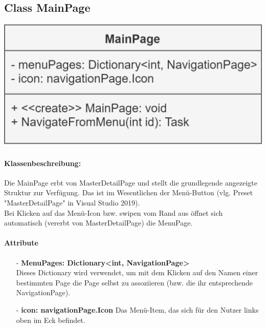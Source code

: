 \documentclass[a4paper,12pt]{article}
\begin{document}
		\begin{minipage}[b]{0.7\textwidth}

			\subsection{Class MainPage}
		\end{minipage}
		\begin{minipage}[c]{0.3\textwidth}
			\includegraphics[width=\textwidth]{bilder/ViewKlassen/MainPage.png}
		\end{minipage}
		\paragraph{Klassenbeschreibung:}
		Die MainPage erbt von MasterDetailPage und stellt die grundlegende angezeigte Struktur zur Verfügung. Das ist im Wesentlichen der Menü-Button (vlg. Preset "MasterDetailPage" in Visual Studio 2019).\\
		Bei Klicken auf das Menü-Icon bzw. swipen vom Rand aus öffnet sich automatisch (vererbt von MasterDetailPage) die MenuPage.
		\paragraph{Attribute}
		\begin{itemize}
			\item [-] \textbf{MenuPages: Dictionary<int, NavigationPage>}\\ Dieses Dictionary wird verwendet, um mit dem Klicken auf den Namen einer bestimmten Page die Page selbst zu assoziieren (bzw. die ihr entsprechende NavigationPage).
			\item [-] \textbf{icon: navigationPage.Icon} Das Menü-Item, das sich für den Nutzer links oben im Eck befindet.
		\end{itemize}
\end{document}
